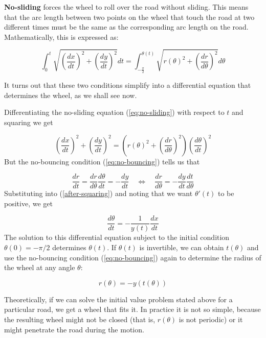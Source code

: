 \documentclass{article}
\theoremstyle{theorem}
\theoremstyle{theorem}
\begin{document}
\noindent \textbf{No-sliding} forces the wheel to roll over the road
without sliding. This means that the arc length between two points on
the wheel that touch the road at two different times must be the same
as the corresponding arc length on the road. Mathematically, this is
expressed as:

\begin{equation}
  \label{eq:no-sliding}
  \int_0^t{\sqrt{\left(\frac{dx}{dt}\right)^2+\left(\frac{dy}{dt}\right)^2}} dt = \int_{-\frac{\pi}{2}}^{\theta(t)}{\sqrt{r(\theta)^2+\left(\frac{dr}{d\theta}\right)^2}} d\theta
\end{equation}

It turns out that these two conditions simplify into a differential
equation that determines the wheel, as we shall see now.

Differentiating the no-sliding equation (\ref{eq:no-sliding}) with
respect to $t$ and squaring we get

\begin{equation}
  \label{after-squaring}
  \left(\frac{dx}{dt}\right)^2+\left(\frac{dy}{dt}\right)^2 = \left(r(\theta)^2+\left(\frac{dr}{d\theta}\right)^2\right)\left(\frac{d\theta}{dt}\right)^2
\end{equation}
But the no-bouncing condition (\ref{eq:no-bouncing}) tells us that

\begin{equation}
  \frac{dr}{dt} = \frac{dr}{d\theta}\frac{d\theta}{dt} = -\frac{dy}{dt} \quad \Leftrightarrow \quad \frac{dr}{d\theta} = -\frac{dy}{dt}\frac{dt}{d\theta}
\end{equation}
Substituting into (\ref{after-squaring}) and noting that we want
$\theta'(t)$ to be positive, we get

\begin{equation}
  \label{ivp}
  \frac{d\theta}{dt}=-\frac{1}{y(t)}\frac{dx}{dt}
\end{equation}
The solution to this differential equation subject to the initial
condition $\theta(0) = -\pi/2$ determines $\theta(t)$. If $\theta(t)$
is invertible, we can obtain $t(\theta)$ and use the no-bouncing
condition (\ref{eq:no-bouncing}) again to determine the radius of the
wheel at any angle $\theta$:

\begin{equation}
  r(\theta) = -y(t(\theta))
\end{equation}

Theoretically, if we can solve the initial value problem stated above
for a particular road, we get a wheel that fits it. In practice it is
not so simple, because the resulting wheel might not be closed (that
is, $r(\theta)$ is not periodic) or it might penetrate the road during
the motion.
\end{document}
